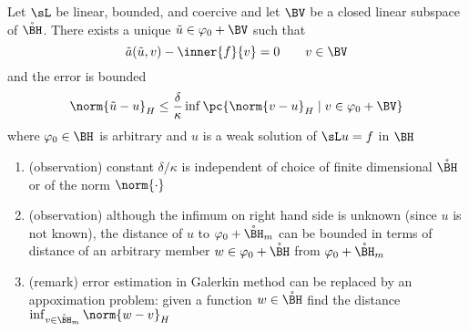 \documentclass[11pt]{article}
\begin{document}
\begin{theorem*}
     Let $\sL$ be linear, bounded, and coercive and let $\BV$ be a  closed linear subspace of $\mathring{\BH}$. There exists a unique $\tu \in \varphi_0+\BV$ such that
    \[
        \ta(\tu, v) - \inner{f}{v} = 0
        \quad \quad v\in\BV    
    \]
    and the error is bounded
    \[
        \norm{\tu - u}_H \leq \frac{\delta}{\kappa} 
        \inf\pc{
            \norm{v-u}_H \mid v\in\varphi_0 + \BV
        }
    \]
    where $\varphi_0 \in \BH$ is arbitrary and $u$ is a weak solution of $\sL u =f $ in $\BH$
    \begin{enumerate}
        \item (observation) constant $\delta/\kappa$ is independent of choice of finite dimensional $\mathring{\BH}$ or of the norm $\norm{\cdot}$
        \item (observation) although the infimum on right hand side is unknown (since $u$ is not known), the distance of $u$ to $\varphi_0 + \mathring{\BH}_m$ can be bounded in terms of distance of an arbitrary member $w\in \varphi_0 + \mathring{\BH}$ from $\varphi_0 + \mathring{\BH}_m$
        \item (remark) error estimation in Galerkin method can be replaced by an appoximation problem: given a function $w\in \mathring{\BH}$ find the distance $\inf_{v\in\mathring{\BH}_m} \norm{w-v}_H$
    \end{enumerate}
\end{theorem*}


\section{}

\section{}

\section{}

\section{}

\section{}
\end{document}
